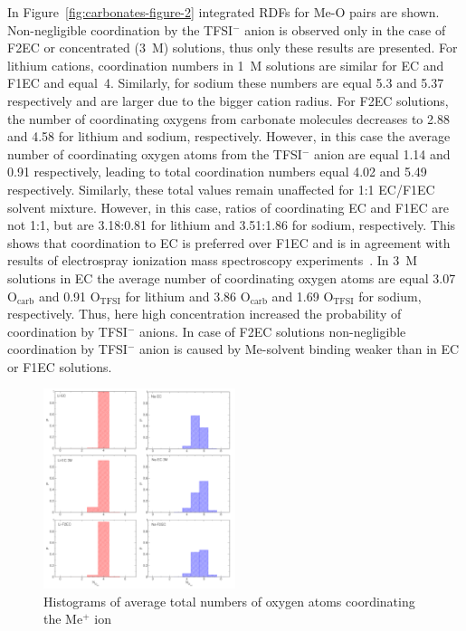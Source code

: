In Figure~\ref{fig:carbonates-figure-2} integrated RDFs for Me-O pairs are shown. Non-negligible coordination by the TFSI$^{-}$ anion is observed only in the case of F2EC or concentrated (3~M) solutions, thus only these results are presented. For lithium cations, coordination numbers in 1~M solutions are similar for EC and F1EC and equal~4. Similarly, for sodium these numbers are equal 5.3 and 5.37 respectively and are larger due to the bigger cation radius. For F2EC solutions, the number of coordinating oxygens from carbonate molecules decreases to 2.88 and 4.58 for lithium and sodium, respectively. However, in this case the average number of coordinating oxygen atoms from the TFSI$^{-}$ anion are equal 1.14 and 0.91 respectively, leading to total coordination numbers equal 4.02 and 5.49 respectively. Similarly, these total values remain unaffected for 1:1 EC/F1EC solvent mixture. However, in this case, ratios of coordinating EC and F1EC are not 1:1, but are 3.18:0.81 for lithium and 3.51:1.86 for sodium, respectively. This shows that coordination to EC is preferred over F1EC and is in agreement with results of electrospray ionization mass spectroscopy experiments~\cite{vibrational-exp-3}. In 3~M solutions in EC the average number of coordinating oxygen atoms are equal 3.07 O$_{\text{carb}}$ and 0.91 O$_{\text{TFSI}}$ for lithium and 3.86 O$_{\text{carb}}$ and 1.69 O$_{\text{TFSI}}$ for sodium, respectively. Thus, here high concentration increased the probability of coordination by TFSI$^{-}$ anions. In case of F2EC solutions non-negligible coordination by TFSI$^{-}$ anion is caused by Me-solvent binding weaker than in EC or F1EC solutions.

\begin{figure}[H]
    \centering
    \includegraphics[width=0.5\textwidth]{img/3-structural-data-from-md-simulations/4-carbonates/histogram-o-atoms.png}
    \caption{Histograms of average total numbers of oxygen atoms coordinating the Me$^{+}$ ion}
    \label{fig:carbonates-histogram-o-atoms}
\end{figure}

